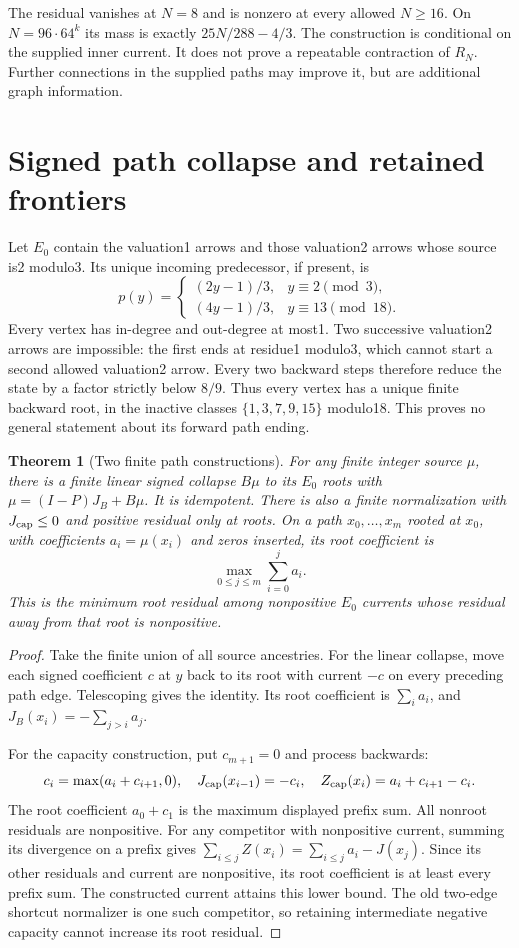 \documentclass[11pt]{article}
\newtheorem{theorem}{Theorem}
\begin{document}
The residual vanishes at $N=8$ and is nonzero at every allowed
$N\ge16$. On $N=96\cdot64^k$ its mass is exactly $25N/288-4/3$.
The construction is conditional on the supplied inner current.
It does not prove a repeatable contraction of $R_N$. Further
connections in the supplied paths may improve it, but are additional
graph information.

\section{Signed path collapse and retained frontiers}

Let $E_0$ contain the valuation1 arrows and those valuation2 arrows
whose source is2 modulo3. Its unique incoming predecessor, if present, is
\[
 p(y)=
 \begin{cases}
 (2y-1)/3,&y\equiv2\pmod3,\\
 (4y-1)/3,&y\equiv13\pmod{18}.
 \end{cases}
\]
Every vertex has in-degree and out-degree at most1. Two successive
valuation2 arrows are impossible: the first ends at residue1 modulo3,
which cannot start a second allowed valuation2 arrow.
Every two backward steps therefore reduce the state by a factor
strictly below $8/9$. Thus every vertex has a unique finite backward
root, in the inactive classes $\{1,3,7,9,15\}$ modulo18.
This proves no general statement about its forward path ending.

\begin{theorem}[Two finite path constructions]\label{thm:pathcollapse}
For any finite integer source $\mu$, there is a finite linear signed
collapse $B\mu$ to its $E_0$ roots with
$\mu=(I-P)J_B+B\mu$. It is idempotent. There is also a finite
normalization with $J_{\rm cap}\le0$ and positive residual only at roots.
On a path $x_0,\ldots,x_m$ rooted at $x_0$, with coefficients
$a_i=\mu(x_i)$ and zeros inserted, its root coefficient is
\[
 \max_{0\le j\le m}\sum_{i=0}^j a_i.
\]
This is the minimum root residual among nonpositive $E_0$ currents
whose residual away from that root is nonpositive.
\end{theorem}
\begin{proof}
Take the finite union of all source ancestries. For the linear collapse,
move each signed coefficient $c$ at $y$ back to its root with current
$-c$ on every preceding path edge. Telescoping gives the identity.
Its root coefficient is $\sum_i a_i$, and
$J_B(x_i)=-\sum_{j>i}a_j$.

For the capacity construction, put $c_{m+1}=0$ and process backwards:
\[
 c_i=\max(a_i+c_{i+1},0),\quad
 J_{\rm cap}(x_{i-1})=-c_i,\quad
 Z_{\rm cap}(x_i)=a_i+c_{i+1}-c_i.
\]
The root coefficient $a_0+c_1$ is the maximum displayed prefix sum.
All nonroot residuals are nonpositive. For any competitor with
nonpositive current, summing its divergence on a prefix gives
$\sum_{i\le j}Z(x_i)=\sum_{i\le j}a_i-J(x_j)$.
Since its other residuals and current are nonpositive, its root
coefficient is at least every prefix sum. The constructed current
attains this lower bound. The old two-edge shortcut normalizer is
one such competitor, so retaining intermediate negative capacity
cannot increase its root residual.
\end{proof}
\end{document}
